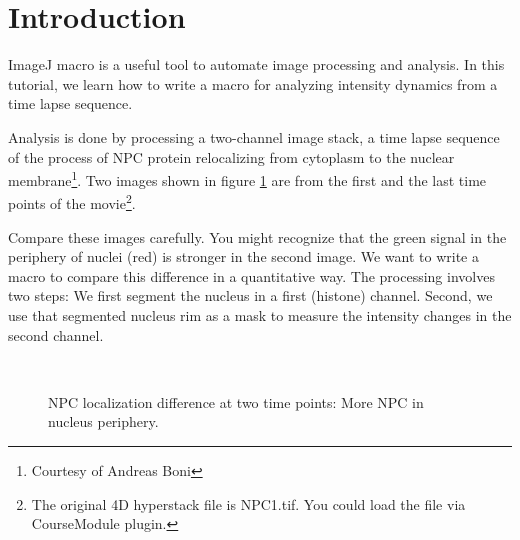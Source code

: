 \section{Introduction}

ImageJ macro is a useful tool to automate image processing and analysis. In this tutorial, we learn how to write a macro for analyzing intensity dynamics from a time lapse sequence. 

Analysis is done by processing a two-channel image stack, a time lapse sequence of the process of NPC protein relocalizing from cytoplasm to the nuclear membrane\footnote{Courtesy of Andreas Boni}. Two images shown in figure \ref{fig:NucStrategy}  are from the first and the last time points of the movie\footnote{The original 4D hyperstack file is NPC1.tif. You could load the file via CourseModule plugin.}.

Compare these images carefully. You might recognize that the green signal in the periphery of nuclei (red) is stronger in the second image. We want to write a macro to compare this difference in a quantitative way. The processing involves two steps: We first segment the nucleus in a first (histone) channel. Second, we use that segmented nucleus rim as a mask to measure the intensity changes in the second channel. 

\begin{figure}[htbp]
 \centering
 \quad
  \\
 \caption{NPC localization difference at two time points: More NPC in nucleus periphery. }
 \label{fig:NucStrategy}
\end{figure}

